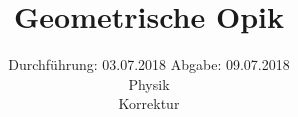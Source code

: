 

\subject{408}
\title{Geometrische Opik}
\date{%
  Durchführung: 03.07.2018
  \hspace{3em}
  Abgabe: 09.07.2018 \\
  Physik \\
  Korrektur
}



\maketitle
\thispagestyle{empty}
\tableofcontents
\newpage






\printbibliography{}


